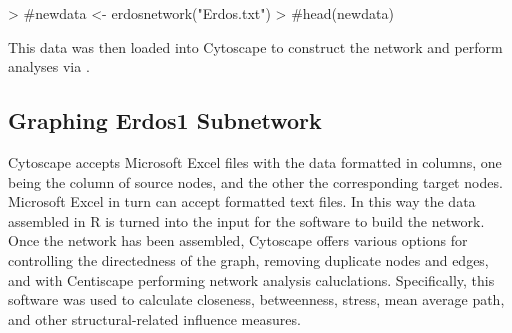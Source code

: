\documentclass[14pt]{article} %
\begin{document}
\begin{Schunk}
\begin{Sinput}
> #newdata <- erdosnetwork("Erdos.txt")
> #head(newdata)
\end{Sinput}
\end{Schunk}
This data was then loaded into Cytoscape to construct the network and perform analyses via .
  \subsection{Graphing Erdos1 Subnetwork}
  \indent Cytoscape accepts Microsoft Excel files with the data formatted in columns, one being the column of source nodes, and the other the corresponding target nodes. Microsoft Excel in turn can accept formatted text files. In this way the data assembled in R is turned into the input for the software to build the network. Once the network has been assembled, Cytoscape offers various options for controlling the directedness of the graph, removing duplicate nodes and edges, and with Centiscape performing network analysis caluclations. Specifically, this software was used to calculate closeness, betweenness, stress, mean average path, and other structural-related influence measures. 
  
\end{document}
